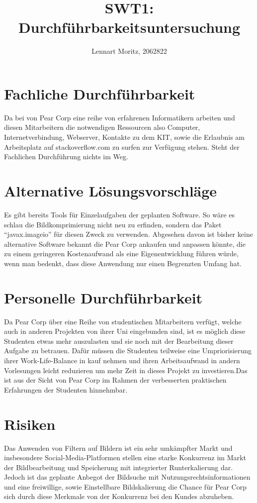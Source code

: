 \documentclass[parskip=full]{scrartcl}
\title{SWT1: Durchführbarkeitsuntersuchung}
\author{Lennart Moritz, 2062822}
\begin{document}
\maketitle

\section{Fachliche Durchführbarkeit}
Da bei von Pear Corp eine reihe von erfahrenen Informatikern arbeiten und diesen Mitarbeitern die notwendigen Ressourcen also \gls{Computer}, Internetverbindung, Webserver, Kontakte zu dem KIT, sowie die Erlaubnis am Arbeitsplatz auf stackoverflow.com zu surfen zur Verfügung stehen. Steht der Fachlichen Durchführung nichts im Weg.

\section{Alternative Lösungsvorschläge}
Es gibt bereits Tools für Einzelaufgaben der geplanten Software. So wäre es schlau die Bildkomprimierung nicht neu zu erfinden, sondern das Paket \enquote{javax.imageio} für diesen Zweck zu verwenden. Abgesehen davon ist bisher keine alternative Software bekannt die Pear Corp ankaufen und anpassen könnte, die zu einem geringeren Kostenaufwand als eine Eigenentwicklung führen würde, wenn man bedenkt, dass diese Anwendung nur einen Begrenzten Umfang hat.

\section{Personelle Durchführbarkeit}
Da Pear Corp über eine Reihe von studentischen Mitarbeitern verfügt, welche auch in anderen Projekten von ihrer Uni eingebunden sind, ist es möglich diese Studenten etwas mehr auszulasten und sie noch mit der Bearbeitung dieser Aufgabe zu betrauen. Dafür müssen die Studenten teilweise eine Umpriorisierung ihrer Work-Life-Balance in kauf nehmen und ihren Arbeitsaufwand in andern Vorlesungen leicht reduzieren um mehr Zeit in dieses Projekt zu investieren.Das ist aus der Sicht von Pear Corp im Rahmen der verbesserten praktischen Erfahrungen der Studenten hinnehmbar.

\section{Risiken}
Das Anwenden von Filtern auf Bildern ist ein sehr umkämpfter Markt und insbesondere Social-Media-Platformen stellen eine starke Konkurrenz im Markt der Bildbearbeitung und Speicherung mit integrierter Runterkalierung dar. Jedoch ist das geplante Anbegot der Bildsuche mit Nutzungsrechtsinformationen und eine freiwillige, sowie Einstellbare Bildskalierung die Chance für Pear Corp sich durch diese Merkmale von der Konkurrenz bei den \Glspl{Kunde} abzuheben.
\end{document}

